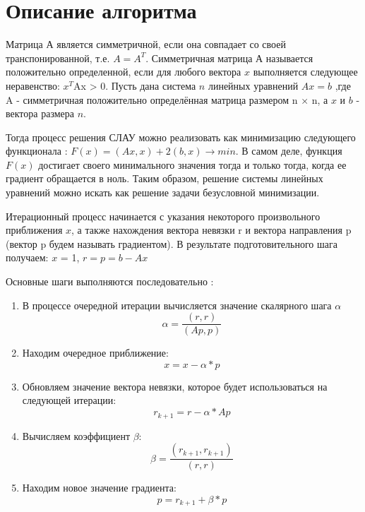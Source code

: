 \documentclass{report}
\begin{document}
\section*{Описание алгоритма}
\par  Матрица А является симметричной, если она совпадает со своей транспонированной, т.е. $A = A^T$. Симметричная матрица А называется положительно определенной, если для любого вектора $x$ выполняется следующее неравенство: $x^T$Ax > 0. Пусть дана система $n$ линейных уравнений $Ax = b$ ,где A - симметричная положительно определённая матрица размером n × n, а $x$ и $b$ - вектора размера $n$.
\par Тогда процесс решения СЛАУ можно реализовать как минимизацию следующего
функционала : $F(x) = (Ax,x) + 2(b,x) \rightarrow min $. В самом деле, функция $F(x)$ достигает своего минимального значения тогда и только тогда, когда ее градиент обращается в ноль. Таким образом, решение системы линейных уравнений можно искать как решение задачи безусловной минимизации.
\par Итерационный процесс начинается с указания некоторого произвольного
приближения $x$, а также нахождения вектора невязки r и вектора направления p (вектор p будем называть градиентом). В результате подготовительного шага получаем: $x$ = 1, $r= p = b-Ax$
\par Основные шаги выполняются последовательно :
\begin{enumerate}
\item В процессе очередной итерации вычисляется значение скалярного шага $\alpha$
\begin{equation}
    \alpha  = \frac{(r,r)}{(Ap,p)}
\end{equation}
\item Находим очередное приближение:
\begin{equation}
   x = x - \alpha * p
\end{equation}
\item Обновляем значение вектора невязки, которое будет использоваться на
следующей итерации:
\begin{equation}
    r_{k+1}  = r - \alpha * Ap
\end{equation}
\item Вычисляем коэффициент $\beta$:
\begin{equation}
    \beta  = \frac{(r_{k+1},r_{k+1})}{(r,r)}
\end{equation}
\item Находим новое значение градиента:
\begin{equation}
   p = r_{k+1} + \beta * p
\end{equation}
\end{enumerate} 
\end{document}
